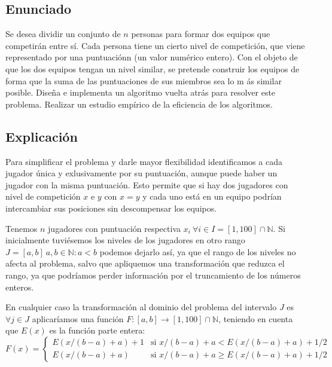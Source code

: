 \subsection{Enunciado}
Se desea dividir un conjunto de $n$ personas para formar dos equipos que competirán entre sí.
Cada persona tiene un cierto nivel de competición, que viene representado por una puntuaciónn
(un valor numérico entero). Con el objeto de que los dos equipos tengan un nivel similar,
se pretende construir los equipos de forma que la suma de las puntuaciones de sus miembros
sea lo m ás similar posible. Diseña e implementa un algoritmo vuelta atrás para resolver este
problema. Realizar un estudio empírico de la eficiencia de los algoritmos.

\subsection{Explicación}
Para simplificar el problema y darle mayor flexibilidad identificamos a cada jugador única y exlusivamente por su puntuación, aunque puede haber un jugador con la misma puntuación. Esto permite que si hay dos jugadores con nivel de competición $x$ e $y$ con $x=y$ y cada uno está en un equipo podrían intercambiar sus posiciones sin descompensar los equipos.

Tenemos $n$ jugadores con puntuación respectiva $x_i\ \forall i\in I=[1, 100]\cap \mathbb{N}$. Si inicialmente tuviésemos los niveles de los jugadores en otro rango $J=[a, b]\ a,b\in\mathbb{N}: a<b$ podemos dejarlo así, ya que el rango de los niveles no afecta al problema, salvo que apliquemos una transformación que reduzca el rango, ya que podríamos perder información por el truncamiento de los números enteros.

En cualquier caso la transformación al dominio del problema del intervalo $J$ es $\forall j\in J$ aplicaríamos una función $F:[a,b] \rightarrow [1,100]\cap\mathbb{N}$, teniendo en cuenta que $E(x)$ es la función parte entera:
\[F(x) = \left\{
	\begin{matrix}
		E( x/(b-a) + a )+1  & \mbox{si } x/(b-a) + a < E( x/(b-a) + a ) + 1/2
	 \\	E( x/(b-a) + a )    & \mbox{si }  x/(b-a) + a \geq E( x/(b-a) + a ) + 1/2
	\end{matrix}
	\right.
\]



